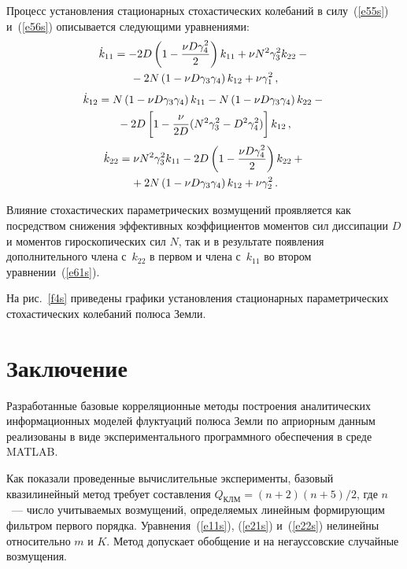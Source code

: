 \begin{multicols}{2}
Процесс установления стационарных стохастических колебаний в силу~(\ref{e55s}) и~(\ref{e56s})
описывается следующими уравнениями:
\begin{multline*}
\dot k_{11}  =- 2 D \left( 1 -\displaystyle\frac{\displaystyle \nu D\gamma_4^2\mathstrut}{\displaystyle 2\mathstrut}\right) k_{11} + \nu N^2 \gamma_3^2 k_{22}\notag -{}\\
{}- 2 N\left( 1 -\nu D\gamma_3\gamma_4\right) k_{12}+\nu \gamma_1^2\,,\notag
\end{multline*}
\begin{multline*}
\dot k_{12} =N\left( 1 -\nu D\gamma_3\gamma_4\right) k_{11} 
-N\left(1- \nu D \gamma_3 \gamma_4\right)k_{22}\notag -{}\\
{} -2D\left[ 1 -\displaystyle\frac{\displaystyle \nu\mathstrut}{\displaystyle 2 D\mathstrut} (N^2\gamma_3^2 - D^2\gamma_4^2)\right] k_{12}\,,\notag
\end{multline*}
\begin{multline}
\dot k_{22}  =\nu N^2 \gamma_3^2 k_{11}- 2 D \left( 1 -\displaystyle\frac{\displaystyle \nu D\gamma_4^2\mathstrut}{\displaystyle 2\mathstrut}\right) k_{22} +{}\\
 {}+ 2 N\left( 1 -\nu D\gamma_3\gamma_4\right) k_{12}+\nu \gamma_2^2\,.
\label{e61s}
\end{multline}


Влияние стохастических параметрических возмущений проявляется как
посредством снижения эффективных коэффициентов моментов сил
диссипации $D$ и моментов гироскопических сил $N$, так и в
результате появления дополнительного члена с~$k_{22}$ в первом
 и члена с~$k_{11}$ во втором уравнении~(\ref{e61s}).


На рис.~\ref{f4s} приведены графики установления стационарных
параметрических стохастических колебаний полюса Земли.


\section{Заключение} %

Разработанные базовые корреляционные методы построения аналитических
информационных моделей флуктуаций полюса Земли по априорным данным
реализованы в виде экспериментального программного обеспечения в
среде MATLAB.

Как показали проведенные вычислительные эксперименты, базовый
квазилинейный метод требует составления $Q_{\mathrm{ КЛМ}} =
(n+2) (n+5)/2$, где $n$~--- число учитываемых возмущений,
определяемых линейным формирующим фильтром первого порядка.
Уравнения~(\ref{e11s}), (\ref{e21s}) и~(\ref{e22s}) нелинейны относительно $m$ и $K$. Метод
допускает обобщение и на негауссовские случайные возмущения.


\end{multicols}
